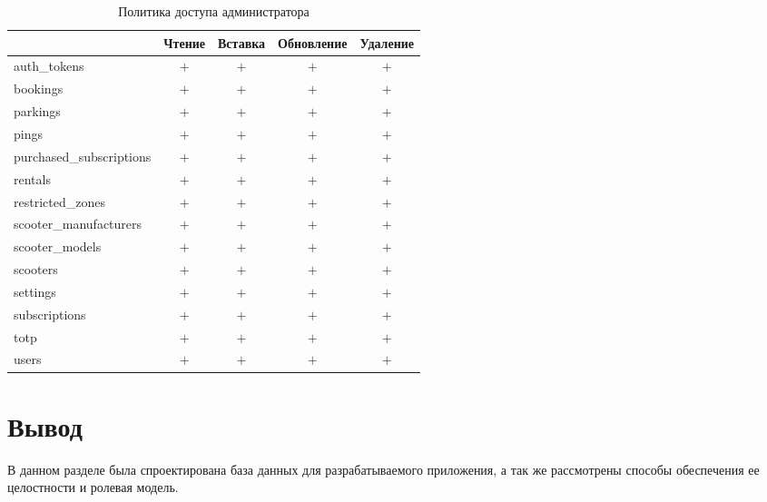 \begin{table}[H]
	\begin{threeparttable}[b]
		\caption{Политика доступа администратора}
		\label{tbl:admin-policy}
		{\renewcommand{\arraystretch}{1.2}
			\begin{tabularx}{\textwidth}
				{
					| >{\raggedright\arraybackslash}X
					| >{\centering\arraybackslash}c
					| >{\centering\arraybackslash}c
					| >{\centering\arraybackslash}c
					| >{\centering\arraybackslash}c |
				}
				\hline
				                         & \textbf{Чтение} & \textbf{Вставка} & \textbf{Обновление} & \textbf{Удаление} \\
				\hline
				auth\_tokens             & $+$             & $+$              & $+$                 & $+$               \\
				\hline
				bookings                 & $+$             & $+$              & $+$                 & $+$               \\
				\hline
				parkings                 & $+$             & $+$              & $+$                 & $+$               \\
				\hline
				pings                    & $+$             & $+$              & $+$                 & $+$               \\
				\hline
				purchased\_subscriptions & $+$             & $+$              & $+$                 & $+$               \\
				\hline
				rentals                  & $+$             & $+$              & $+$                 & $+$               \\
				\hline
				restricted\_zones        & $+$             & $+$              & $+$                 & $+$               \\
				\hline
				scooter\_manufacturers   & $+$             & $+$              & $+$                 & $+$               \\
				\hline
				scooter\_models          & $+$             & $+$              & $+$                 & $+$               \\
				\hline
				scooters                 & $+$             & $+$              & $+$                 & $+$               \\
				\hline
				settings                 & $+$             & $+$              & $+$                 & $+$               \\
				\hline
				subscriptions            & $+$             & $+$              & $+$                 & $+$               \\
				\hline
				totp                     & $+$             & $+$              & $+$                 & $+$               \\
				\hline
				users                    & $+$             & $+$              & $+$                 & $+$               \\
				\hline
			\end{tabularx}}
	\end{threeparttable}
\end{table}

\section*{Вывод}

В данном разделе была спроектирована база данных для разрабатываемого приложения, а так же рассмотрены способы обеспечения ее целостности и ролевая модель.